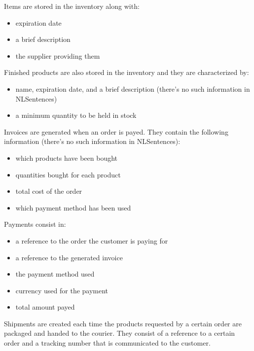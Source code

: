 Items are stored in the inventory along with:
\begin{itemize}
	\item expiration date
	\item a brief description
	\item the supplier providing them
\end{itemize}
Finished products are also stored in the inventory and they are characterized by:
\begin{itemize}
	\item name, expiration date, and a brief description (there's no such information in NLSentences)
	\item a minimum quantity to be held in stock
\end{itemize}
Invoices are generated when an order is payed. They contain the following information (there's no such information in NLSentences):
\begin{itemize}
	\item which products have been bought
	\item quantities bought for each product
	\item total cost of the order
	\item which payment method has been used
\end{itemize}
Payments consist in:
\begin{itemize}
	\item a reference to the order the customer is paying for
	\item a reference to the generated invoice
	\item the payment method used
	\item currency used for the payment
	\item total amount payed
\end{itemize}
Shipments are created each time the products requested by a certain order are packaged and handed to the courier. They consist of a reference to a certain order and a tracking number that is communicated to the customer.